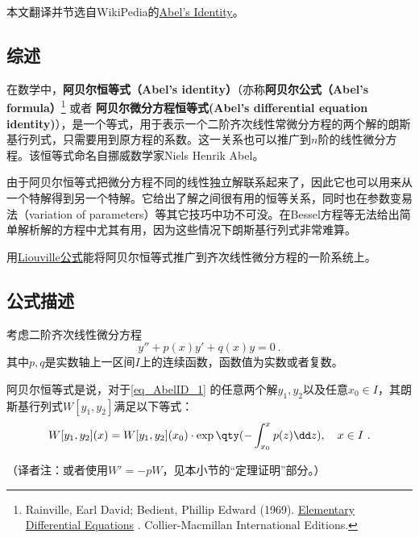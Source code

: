 
本文翻译并节选自WikiPedia的\href{https://en.wikipedia.org/wiki/Abel\%27s_identity}{Abel's Identity}。


\subsection{综述}

在数学中，\textbf{阿贝尔恒等式（Abel's identity）}（亦称\textbf{阿贝尔公式（Abel's formula）}\footnote{ Rainville, Earl David; Bedient, Phillip Edward (1969). \href{https://archive.org/details/elementarydiffer00rain}{ Elementary Differential Equations} . Collier-Macmillan International Editions.} 或者 \textbf{阿贝尔微分方程恒等式(Abel's differential equation identity)}），是一个等式，用于表示一个二阶齐次线性常微分方程的两个解的朗斯基行列式，只需要用到原方程的系数。这一关系也可以推广到$n$阶的线性微分方程。该恒等式命名自挪威数学家Niels Henrik Abel。

由于阿贝尔恒等式把微分方程不同的线性独立解联系起来了，因此它也可以用来从一个特解得到另一个特解。它给出了解之间很有用的恒等关系，同时也在参数变易法（variation of parameters）等其它技巧中功不可没。在Bessel方程等无法给出简单解析解的方程中尤其有用，因为这些情况下朗斯基行列式非常难算。

用\href{https://en.wikipedia.org/wiki/Liouville\%27s_formula}{Liouville公式}能将阿贝尔恒等式推广到齐次线性微分方程的一阶系统上。



\subsection{公式描述}

考虑二阶齐次线性微分方程
\begin{equation}\label{eq_AbelID_1}
y'' + p(x)y' +q(x)y = 0~.
\end{equation}
其中$p, q$是实数轴上一区间$I$上的连续函数，函数值为实数或者复数。

阿贝尔恒等式是说，对于\autoref{eq_AbelID_1} 的任意两个解$y_1, y_2$以及任意$x_0\in I$，其朗斯基行列式$W[y_1, y_2]$满足以下等式：
\begin{equation}\label{eq_AbelID_4}
W[y_1, y_2](x) = W[y_1, y_2](x_0)\cdot \exp\qty(-\int _{x_0}^x p(z)\dd z), \quad x\in I~.
\end{equation}

（译者注：或者使用$W'=-pW$，见本小节的“定理证明”部分。）


